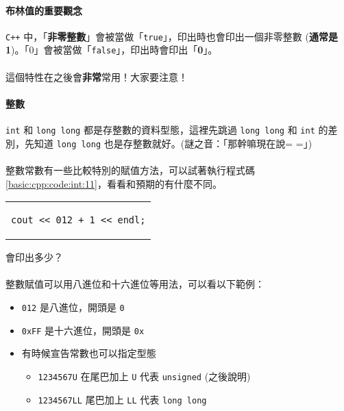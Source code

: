 \documentclass[12pt,a4paper,oneside]{article}
\begin{document}
\begin{CJK}{UTF8}{bkai}
\paragraph{布林值的重要觀念}\texttt{C++} 中，「\textbf{非零整數}」會被當做「\lstinline!true!」，印出時也會印出一個非零整數 (\textbf{通常是 1})。「0」會被當做「\lstinline!false!」，印出時會印出「\textbf{0}」。
\paragraph{}這個特性在之後會\textbf{非常}常用！大家要注意！

\paragraph{整數}\lstinline!int! 和 \lstinline!long long! 都是存整數的資料型態，這裡先跳過 \lstinline!long long! 和 \lstinline!int! 的差別，先知道 \lstinline!long long! 也是存整數就好。(謎之音：「那幹嘛現在說= =」)
\paragraph{}整數常數有一些比較特別的賦值方法，可以試著執行程式碼 \ref{basic:cpp:code:int:11}，看看和預期的有什麼不同。

\begin{code}[h!]
\centering
\begin{tabular}{c}
\begin{lstlisting}
cout << 012 + 1 << endl;
\end{lstlisting}
\end{tabular}
\caption{會印出多少？}
\label{basic:cpp:code:int:11}
\end{code}

\paragraph{}整數賦值可以用八進位和十六進位等用法，可以看以下範例：
\begin{itemize}
\item \lstinline!012! 是八進位，開頭是 \lstinline!0!
\item \lstinline!0xFF! 是十六進位，開頭是 \lstinline!0x!
\item 有時候宣告常數也可以指定型態
  \begin{itemize}
  \item \lstinline!1234567U! 在尾巴加上 \lstinline!U! 代表 \lstinline!unsigned! (之後說明)
  \item \lstinline!1234567LL! 尾巴加上 \lstinline!LL! 代表 \lstinline!long long!
  \end{itemize}
\end{itemize}


\end{CJK}
\end{document}
